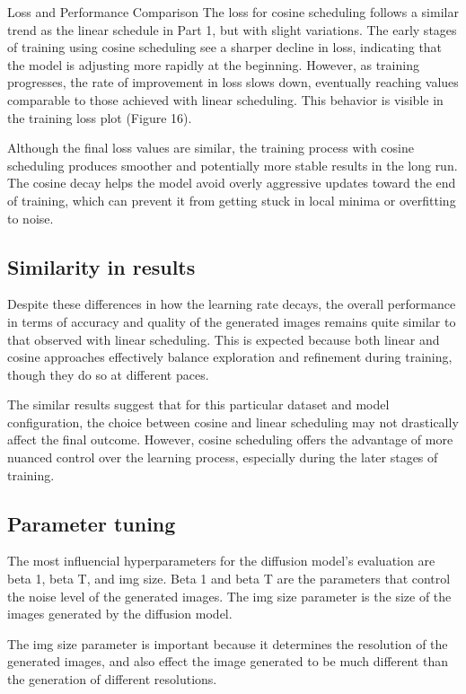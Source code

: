 \documentclass[conference]{IEEEtran}
\begin{document}
Loss and Performance Comparison
The loss for cosine scheduling follows a similar trend as the linear schedule in Part 1, but with slight variations. The early stages of training using cosine scheduling see a sharper decline in loss, indicating that the model is adjusting more rapidly at the beginning. However, as training progresses, the rate of improvement in loss slows down, eventually reaching values comparable to those achieved with linear scheduling. This behavior is visible in the training loss plot (Figure 16).

Although the final loss values are similar, the training process with cosine scheduling produces smoother and potentially more stable results in the long run. The cosine decay helps the model avoid overly aggressive updates toward the end of training, which can prevent it from getting stuck in local minima or overfitting to noise.


\subsection{Similarity in results}
Despite these differences in how the learning rate decays, the overall performance in terms of accuracy and quality of the generated images remains quite similar to that observed with linear scheduling. This is expected because both linear and cosine approaches effectively balance exploration and refinement during training, though they do so at different paces. 

The similar results suggest that for this particular dataset and model configuration, the choice between cosine and linear scheduling may not drastically affect the final outcome. However, cosine scheduling offers the advantage of more nuanced control over the learning process, especially during the later stages of training.

\subsection{Parameter tuning}
The most influencial hyperparameters for the diffusion model's evaluation are beta 1, beta T, and img size. Beta 1 and beta T are the parameters that control the noise level of the generated images. The img size parameter is the size of the images generated by the diffusion model. 

The img size parameter is important because it determines the resolution of the generated images, and also effect the image generated to be much different than the generation of different resolutions.
\end{document}
